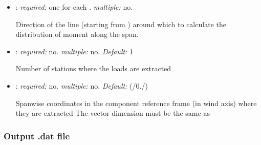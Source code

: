 \begin{itemize}
\item {}: \textit{required:} one for each . 
\textit{multiple:} no.

Direction of the line (starting from ) around which to calculate 
the distribution of moment along the span.

\item {}: \textit{required:} no. \textit{multiple:} no. 
\textit{Default:} 1

Number of stations where the loads are extracted 

\item {}: \textit{required:} no. \textit{multiple:} no. 
\textit{Default:} (/0./)

Spanwise coordinates in the component reference frame (in wind axis) where they are extracted
The vector dimension must be the same as 

\end{itemize}

\subsubsection{Output .dat file}

